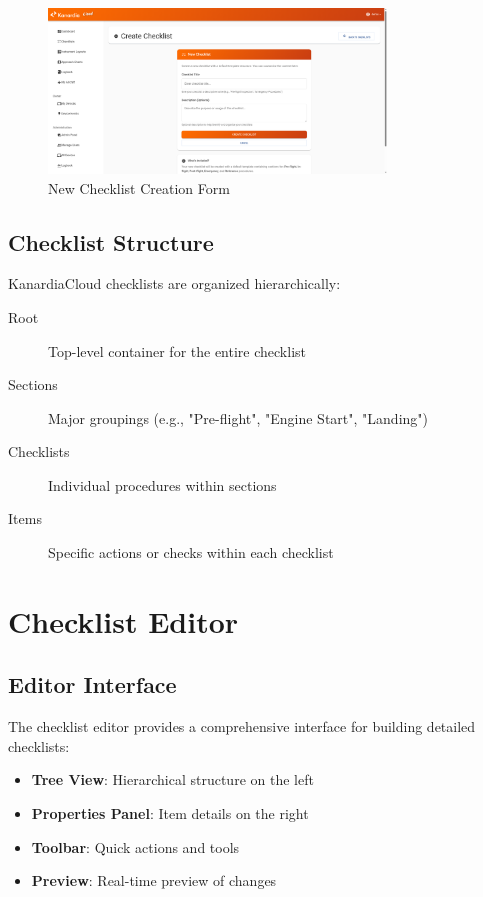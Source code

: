 \begin{figure}[H]
\centering
\includegraphics[width=0.8\textwidth]{images/create_checklist_form.png}
\caption{New Checklist Creation Form}
\label{fig:create_checklist_form}
\end{figure}

\subsection{Checklist Structure}

KanardiaCloud checklists are organized hierarchically:

\begin{description}
    \item[Root] Top-level container for the entire checklist
    \item[Sections] Major groupings (e.g., "Pre-flight", "Engine Start", "Landing")
    \item[Checklists] Individual procedures within sections
    \item[Items] Specific actions or checks within each checklist
\end{description}

\section{Checklist Editor}

\subsection{Editor Interface}

The checklist editor provides a comprehensive interface for building detailed checklists:

\begin{itemize}
    \item \textbf{Tree View}: Hierarchical structure on the left
    \item \textbf{Properties Panel}: Item details on the right
    \item \textbf{Toolbar}: Quick actions and tools
    \item \textbf{Preview}: Real-time preview of changes
\end{itemize}

